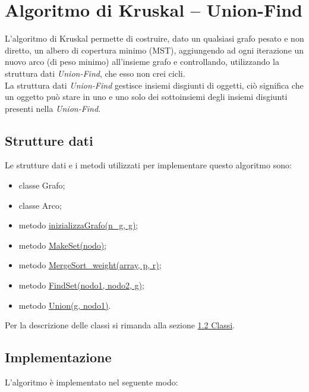 \section{Algoritmo di Kruskal -- Union-Find}
\label{Algoritmo_di_Kruskal_Union-Find}

L'algoritmo di Kruskal permette di costruire, dato un qualsiasi grafo pesato e non diretto, un albero di copertura minimo (MST), aggiungendo ad ogni iterazione un nuovo arco (di peso minimo) all'insieme grafo e controllando, utilizzando la struttura dati \textit{Union-Find}, che esso non crei cicli. \\
La struttura dati \textit{Union-Find} gestisce insiemi disgiunti di oggetti, ciò significa che un oggetto può stare in uno e uno solo dei sottoinsiemi degli insiemi disgiunti presenti nella \textit{Union-Find}.

\subsection{Strutture dati}
\label{strutture_dati}

Le strutture dati e i metodi utilizzati per implementare questo algoritmo sono:

\begin{itemize}
    \item classe Grafo;
    \item classe Arco;
    \item metodo \hyperlink{inizializzagrafo}{inizializzaGrafo(n\_g, g)};
    \item metodo \hyperlink{makeset}{MakeSet(nodo)};
    \item metodo \hyperlink{mergesort}{MergeSort\_weight(array, p, r)};
    \item metodo \hyperlink{findset}{FindSet(nodo1, nodo2, g)};
    \item metodo \hyperlink{union}{Union(g, nodo1)}.
\end{itemize}

Per la descrizione delle classi si rimanda alla sezione \hyperlink{section.2}{1.2 Classi}.
\newline


\subsection{Implementazione}
\label{implementazione}

L'algoritmo è implementato nel seguente modo:

